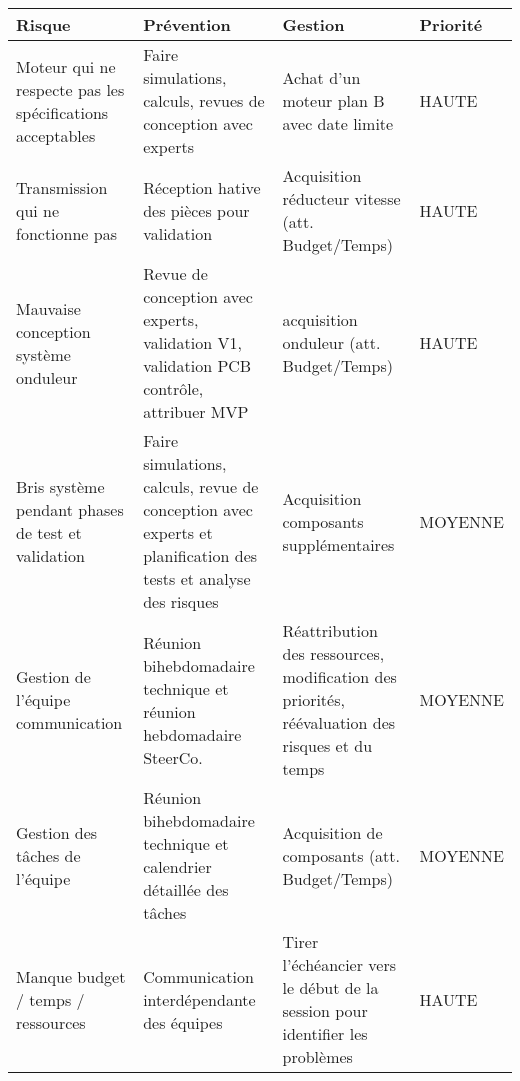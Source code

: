\begin{tabularx}{\linewidth}{
    |>{\let\newline\\\hsize=0.40\hsize}X|%
    >{\hsize=0.25\hsize}X|%
    >{\hsize=0.25\hsize}X|%
    >{\centering\arraybackslash\hsize=0.1\hsize}X|%
  }
    \hline
    \textbf{Risque} & \textbf{Prévention} & \textbf{Gestion} & \textbf{Priorité}\\\hline
    Moteur qui ne respecte pas les spécifications acceptables & Faire simulations, calculs, revues de conception avec experts & Achat d'un moteur plan B avec date limite & HAUTE\\\hline
    
    Transmission qui ne fonctionne pas & Réception hative des pièces pour validation & Acquisition réducteur vitesse (att. Budget/Temps) & HAUTE\\\hline
    
    Mauvaise conception système onduleur & Revue de conception avec experts, validation V1, validation PCB contrôle, attribuer MVP & acquisition onduleur (att. Budget/Temps) & HAUTE\\\hline
    
    Bris système pendant phases de test et validation & Faire simulations, calculs, revue de conception avec experts et planification des tests et analyse des risques & Acquisition composants supplémentaires & MOYENNE\\\hline

    Gestion de l'équipe communication & Réunion bihebdomadaire technique et réunion hebdomadaire SteerCo. & Réattribution des ressources, modification des priorités, réévaluation des risques et du temps & MOYENNE\\\hline
    
    Gestion des tâches de l'équipe & Réunion bihebdomadaire technique et calendrier détaillée des tâches & Acquisition de composants (att. Budget/Temps) & MOYENNE\\\hline

    Manque budget / temps / ressources & Communication interdépendante des équipes & Tirer l'échéancier vers le début de la session pour identifier les problèmes & HAUTE\\\hline
    
  \end{tabularx}
  
  

